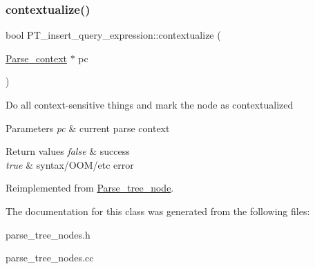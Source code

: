 \subsubsection{\texorpdfstring{contextualize()}{contextualize()}}
{\footnotesize\ttfamily bool P\+T\+\_\+insert\+\_\+query\+\_\+expression\+::contextualize (\begin{DoxyParamCaption}\item[{\mbox{\hyperlink{structParse__context}{Parse\+\_\+context}} $\ast$}]{pc }\end{DoxyParamCaption})\hspace{0.3cm}{\ttfamily [virtual]}}

Do all context-\/sensitive things and mark the node as contextualized


\begin{DoxyParams}{Parameters}
{\em pc} & current parse context\\
\hline
\end{DoxyParams}

\begin{DoxyRetVals}{Return values}
{\em false} & success \\
\hline
{\em true} & syntax/\+O\+O\+M/etc error \\
\hline
\end{DoxyRetVals}


Reimplemented from \mbox{\hyperlink{classParse__tree__node_a22d93524a537d0df652d7efa144f23da}{Parse\+\_\+tree\+\_\+node}}.



The documentation for this class was generated from the following files\+:\begin{DoxyCompactItemize}
\item 
parse\+\_\+tree\+\_\+nodes.\+h\item 
parse\+\_\+tree\+\_\+nodes.\+cc\end{DoxyCompactItemize}
